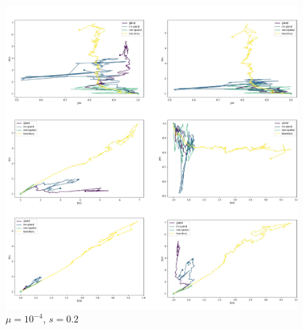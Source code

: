 \begin{figure}[h]
\centering
\includegraphics[width=\textwidth]{Chapter_3/figures/1e0402new.pdf}
\caption{$\mu=10^{-4}$, $s=0.2$}
\label{fig:1e0402new}
\end{figure}

